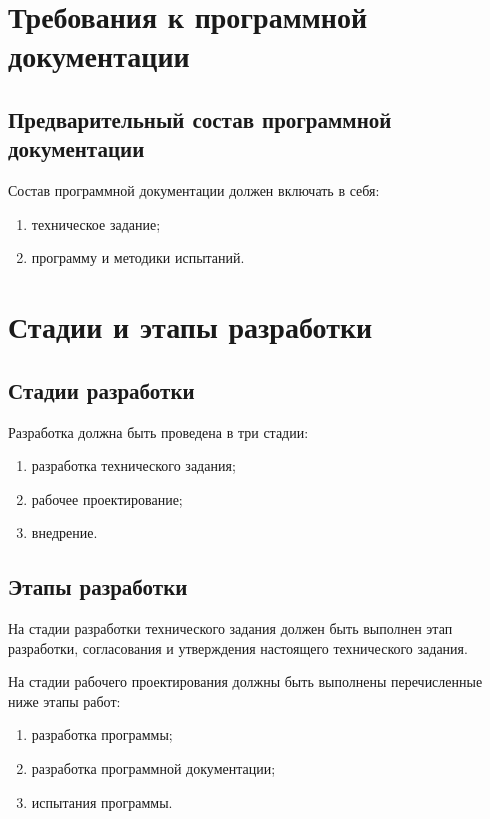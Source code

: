 \chapter{Требования к программной документации}
\section{Предварительный состав программной документации}
Состав программной документации должен включать в себя:
\begin{enumerate}
    \item техническое задание;
    \item программу и методики испытаний.
\end{enumerate}


\chapter{Стадии и этапы разработки}
\section{Стадии разработки}
Разработка должна быть проведена в три стадии:
\begin{enumerate}
    \item разработка технического задания;
    \item рабочее проектирование;
    \item внедрение.
\end{enumerate}

\section{Этапы разработки}
На стадии разработки технического задания должен быть выполнен этап разработки, согласования и утверждения 
настоящего технического задания.

На стадии рабочего проектирования должны быть выполнены перечисленные ниже этапы работ:
\begin{enumerate}
    \item разработка программы;
    \item разработка программной документации;
    \item испытания программы.
\end{enumerate}

